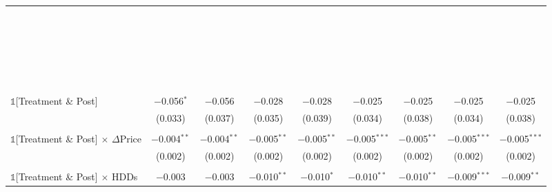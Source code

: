 \begin{table}[!htbp]
\begin{longtable}{@{\extracolsep{0pt}}lcccccccc}
        & & & & & & & & \\
          & & & & & & & & \\
            & & & & & & & & \\
              & & & & & & & & \\
                & & & & & & & & \\
                  & & & & & & & & \\
                    & & & & & & & & \\ 
                      & & & & & & & & \\
    & & & & & & & & \\
      & & & & & & & & \\
        & & & & & & & & \\
          & & & & & & & & \\
            & & & & & & & & \\
              & & & & & & & & \\
                & & & & & & & & \\
                  & & & & & & & & \\
                    & & & & & & & & \\ 
                      & & & & & & & & \\
    & & & & & & & & \\
      & & & & & & & & \\
        & & & & & & & & \\
          & & & & & & & & \\
            & & & & & & & & \\
              & & & & & & & & \\
 $\mathbb{1}$[Treatment \& Post] & $-$0.056$^{*}$ & $-$0.056 & $-$0.028 & $-$0.028 & $-$0.025 & $-$0.025 & $-$0.025 & $-$0.025 \\ 
  & (0.033) & (0.037) & (0.035) & (0.039) & (0.034) & (0.038) & (0.034) & (0.038) \\ 
  & & & & & & & & \\ 
 $\mathbb{1}$[Treatment \& Post] $\times$ $\Delta$Price & $-$0.004$^{**}$ & $-$0.004$^{**}$ & $-$0.005$^{**}$ & $-$0.005$^{**}$ & $-$0.005$^{***}$ & $-$0.005$^{**}$ & $-$0.005$^{***}$ & $-$0.005$^{***}$ \\ 
  & (0.002) & (0.002) & (0.002) & (0.002) & (0.002) & (0.002) & (0.002) & (0.002) \\ 
  & & & & & & & & \\ 
 $\mathbb{1}$[Treatment \& Post] $\times$ HDDs & $-$0.003 & $-$0.003 & $-$0.010$^{**}$ & $-$0.010$^{*}$ & $-$0.010$^{**}$ & $-$0.010$^{**}$ & $-$0.009$^{***}$ & $-$0.009$^{**}$ \\ 

\end{longtable}
\end{table}
